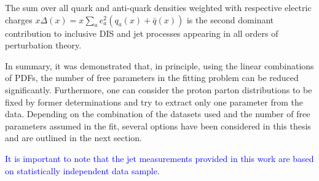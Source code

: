 The sum over all quark and anti-quark densities weighted with respective electric charges $x\Delta\left(x\right)=x\sum_{a}{e_a^2\left(q_a\left(x\right)+\bar{q}\left(x\right)\right)}$ is the second dominant contribution to  inclusive DIS and jet processes appearing in all orders of perturbation theory.

In summary, it was demonstrated that, in principle, using the linear combinations of PDFs, the number of free parameters in the fitting problem can be reduced significantly. Furthermore, one can consider the proton parton distributions to be fixed by former determinations and try to extract only one parameter \asz from the data. Depending on the combination of the datasets used and the number of free parameters assumed in the fit, several options have been considered in this thesis and are outlined in the next section.

\textcolor{blue}{It is important to note that the jet measurements provided in this work are based on statistically independent data sample.}